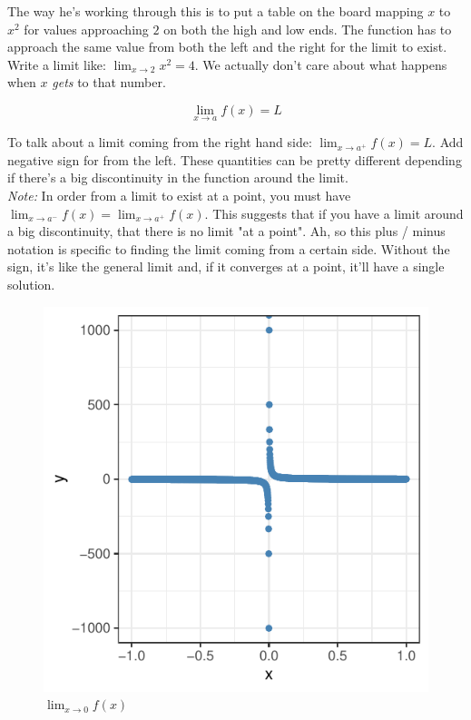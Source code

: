 \documentclass{article}
\begin{document}
The way he's working through this is to put a table on the board mapping $x$ to $x^2$ for
values approaching $2$ on both the high and low ends. The function has to approach the
same value from both the left and the right for the limit to exist. Write a limit like:
$\lim_{x\to 2} x^2 = 4$. We actually don't care about what happens when $x$ \emph{gets} to
that number.

$$
\lim_{x\to a} f(x) = L
$$

To talk about a limit coming from the right hand side: $\lim_{x\to a^+} f(x) = L$. Add
negative sign for from the left. These quantities can be pretty different depending if
there's a big discontinuity in the function around the limit. \\

\emph{Note:} In order from a limit to exist at a point, you must have $\lim_{x \to a^-}
f(x) = \lim_{x \to a^+} f(x).$ This suggests that if you have a limit around a big
discontinuity, that there is no limit "at a point". Ah, so this plus / minus notation is
specific to finding the limit coming from a certain side. Without the sign, it's like the
general limit and, if it converges at a point, it'll have a single solution. 

\begin{figure}[H]
    \centering
    \includegraphics{zero_limit.pdf}
    \caption{$\lim_{x \to 0}f(x)$}
    \label{fig:zero-limit}
\end{figure}
\end{document}
